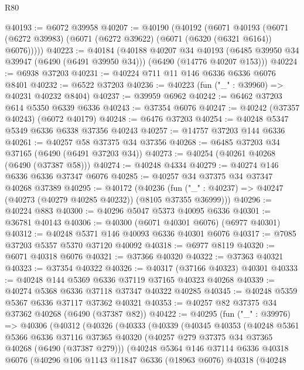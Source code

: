 \begin{lexlean}{R80}
\begin{coremodule}
@40193 := @6072 @39958
@40207 := @40190
    (@40192
      (@6071
        @40193
        (@6071 (@6272 @39983) (@6071 (@6272 @39622) (@6071 (@6320 (@6321 @6164)) @6076)))))
@40223 := @40184
    (@40188
      @40207
      @34
      @40193
      (@6485 @39950 @34 @39947 (@6490 (@6491 @39950 @34)))
      (@6490 (@14776 @40207 @153)))
@40224 := @6938 @37203
@40231 := @40224 @711 @11 @146 @6336 @6336 @6076 @8401
@40232 := @6522 @37203
@40236 := @40223 (fun ("_" : @39960) => @40231 @40232 @8404)
@40237 := @39959 @6962
@40242 := @6462 @37203 @614 @5350 @6339 @6336
@40243 := @37354 @6076
@40247 := @40242 (@37357 @40243) (@6072 @40179)
@40248 := @6476 @37203
@40254 := @40248 @5347 @5349 @6336 @6338 @37356 @40243
@40257 := @14757 @37203 @144 @6336
@40261 := @40257 @58 @37375 @34 @37356
@40268 := @6485 @37203 @34 @37165 (@6490 (@6491 @37203 @34))
@40273 := @40254 (@40261 @40268 (@6490 (@37387 @58)))
@40274 := @40248 @4334
@40279 := @40274 @146 @6336 @6336 @37347 @6076
@40285 := @40257 @34 @37375 @34 @37347 @40268 @37389
@40295 := @40172
    (@40236 (fun ("_" : @40237) => @40247 (@40273 (@40279 @40285 @40232)) (@8105 @37355 @36999)))
@40296 := @40224 @883
@40300 := @40296 @5047 @5373 @40095 @6336
@40301 := @36781 @40143
@40306 := @40300 (@6071 @40301 @6076) (@6977 @40301)
@40312 := @40248 @5371 @146 @40093 @6336 @40301 @6076
@40317 := @7085 @37203 @5357 @5370 @37120 @40092
@40318 := @6977 @8119
@40320 := @6071 @40318 @6076
@40321 := @37366 @40320
@40322 := @37363 @40321
@40323 := @37354 @40322
@40326 := @40317 (@37166 @40323) @40301
@40333 := @40248 @144 @5369 @6336 @37119 @37165 @40323 @40268
@40339 := @40274 @5368 @6336 @37118 @37347 @40322 @40285
@40345 := @40248 @5359 @5367 @6336 @37117 @37362 @40321
@40353 := @40257 @82 @37375 @34 @37362 @40268 (@6490 (@37387 @82))
@40422 := @40295
    (fun ("_" : @39976) =>
    @40306
      (@40312
        (@40326
          (@40333
            (@40339
              (@40345
                @40353
                (@40248
                  @5361
                  @5366
                  @6336
                  @37116
                  @37365
                  @40320
                  (@40257 @279 @37375 @34 @37365 @40268 (@6490 (@37387 @279)))
                  (@40248
                    @5364
                    @146
                    @37114
                    @6336
                    @40318
                    @6076
                    (@40296
                      @106
                      @1143
                      @11847
                      @6336
                      (@18963 @6076)
                      @40318
                      (@40248

\end{coremodule}
\end{lexlean}
